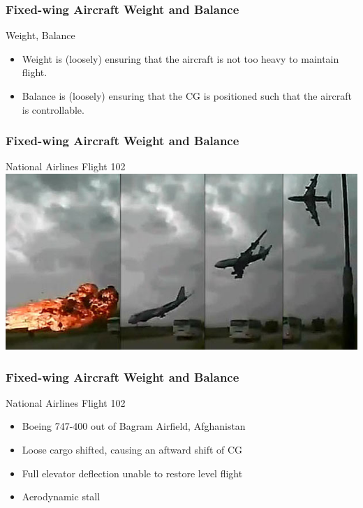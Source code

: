 \begin{frame}
\frametitle{Fixed-wing Aircraft Weight and Balance}
\begin{block}{Weight, Balance}
\begin{itemize}
\item Weight is (loosely) ensuring that the aircraft is not too heavy to maintain flight.
\item Balance is (loosely) ensuring that the CG is positioned such that the aircraft is controllable.
\end{itemize}
\end{block}
\end{frame}

\begin{frame}
\frametitle{Fixed-wing Aircraft Weight and Balance}
\begin{block}{National Airlines Flight 102}
\includegraphics[height=0.5\textheight]{image/bagram-102.jpg}
\end{block}
\end{frame}

\begin{frame}
\frametitle{Fixed-wing Aircraft Weight and Balance}
\begin{block}{National Airlines Flight 102}
\begin{itemize}
\item<1-> Boeing 747-400 out of Bagram Airfield, Afghanistan
\item<2-> Loose cargo shifted, causing an aftward shift of CG
\item<3-> Full elevator deflection unable to restore level flight
\item<4-> Aerodynamic stall
\end{itemize}
\end{block}
\end{frame}

